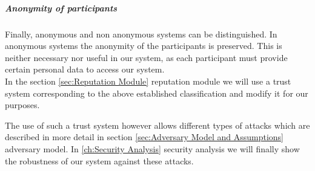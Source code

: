 \subparagraph{Anonymity of participants} Finally, anonymous and non anonymous systems can be distinguished. In anonymous systems the anonymity of the participants is preserved. This is neither necessary nor useful in our system, as each participant must provide certain personal data to access our system. \\

In the section \ref{sec:Reputation Module} reputation module we will use a trust system corresponding to the above established classification and modify it for our purposes.

The use of such a trust system however allows different types of attacks which are described in more detail in section \ref{sec:Adversary Model and Assumptions} adversary model. In \ref{ch:Security Analysis} security analysis we will finally show the robustness of our system against these attacks.
